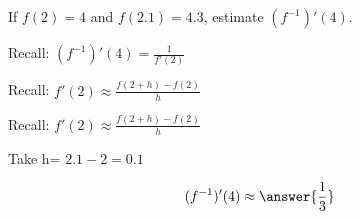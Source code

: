 \documentclass{ximera}
\author{Steven Gubkin\and Nela Lakos}
\begin{document}
\begin{exercise}

If $f(2) = 4$ and $f(2.1) = 4.3$, estimate $(f^{-1})'(4)$.

\begin{hint}
Recall:  $(f^{-1})'(4)=\frac{1}{f'(2)}$
\end{hint}

\begin{hint}
Recall:  $f'(2)\approx\frac{f(2+h)-f(2)}{h}$
\end{hint}

\begin{hint}
Recall:  $f'(2)\approx\frac{f(2+h)-f(2)}{h}$


Take h= $2.1-2=0.1$
\end{hint}
\begin{prompt}
\[
(f^{-1})'(4) \approx \answer{\frac{1}{3}}
\]
\end{prompt}
\end{exercise}
\end{document}
